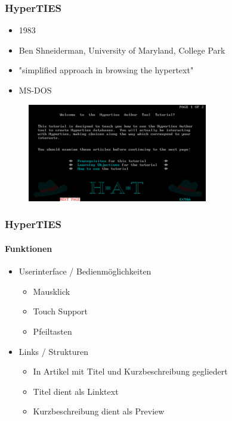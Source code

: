 \begin{frame}
\frametitle{HyperTIES}
\begin{itemize}
	\item 1983
	\item Ben Shneiderman, University of Maryland, College Park
	\item "simplified approach in browsing the hypertext"
	\item MS-DOS
\end{itemize}

\begin{figure}[htbp]
	\centering
	\includegraphics[width=0.7\textwidth]{images/hyperties}
\end{figure}

\end{frame}

\begin{frame}
\frametitle{HyperTIES}
\framesubtitle{Funktionen}
	\begin{itemize}
		\item Userinterface / Bedienmöglichkeiten
		\begin{itemize}
			\item Mausklick
			\item Touch Support 
			\item Pfeiltasten
		\end{itemize}
		\item Links / Strukturen
		\begin{itemize}
			\item In Artikel mit Titel und Kurzbeschreibung gegliedert
			\item Titel dient als Linktext
			\item Kurzbeschreibung dient als Preview
		\end{itemize}
	\end{itemize}
\end{frame}